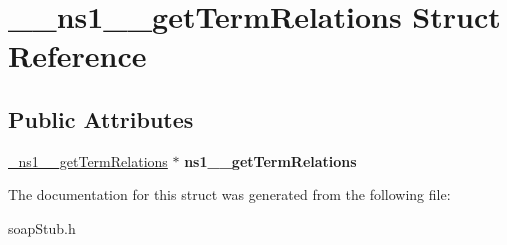 \hypertarget{struct____ns1____getTermRelations}{
\section{\_\-\_\-ns1\_\-\_\-getTermRelations Struct Reference}
\label{struct____ns1____getTermRelations}
}
\subsection*{Public Attributes}
\begin{DoxyCompactItemize}
\item 
\hypertarget{struct____ns1____getTermRelations_afd7b69fb5291a310f17a7d5096d46467}{
\hyperlink{class__ns1____getTermRelations}{\_\-ns1\_\-\_\-getTermRelations} $\ast$ {\bfseries ns1\_\-\_\-getTermRelations}}
\label{struct____ns1____getTermRelations_afd7b69fb5291a310f17a7d5096d46467}

\end{DoxyCompactItemize}


The documentation for this struct was generated from the following file:\begin{DoxyCompactItemize}
\item 
soapStub.h\end{DoxyCompactItemize}
